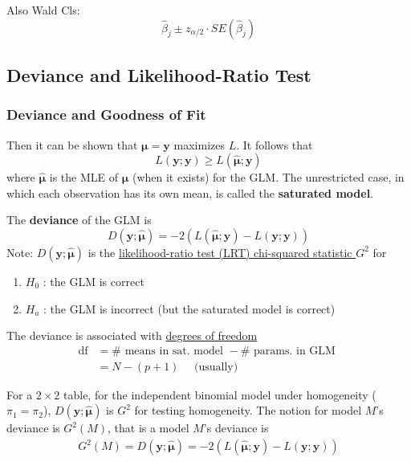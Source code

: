 \documentclass[11pt]{elegantbook}
\begin{document}
Also Wald Cls:
$$
\hat{\beta}_j \pm z_{\alpha / 2} \cdot S E\left(\hat{\beta}_j\right)
$$





\subsection{Deviance  and Likelihood-Ratio Test}
\subsubsection{ Deviance and Goodness of Fit}
Then it can be shown that $\boldsymbol{\mu}=\boldsymbol{y}$ maximizes $L$.
It follows that
$$
L(\boldsymbol{y} ; \boldsymbol{y}) \geq L(\hat{\boldsymbol{\mu}} ; \boldsymbol{y})
$$
where $\hat{\boldsymbol{\mu}}$ is the MLE of $\boldsymbol{\mu}$ (when it exists) for the GLM.
The unrestricted case, in which each observation has its own mean, is called the \textbf{saturated model}.

\begin{definition}[Deviance]
    \normalfont
    The \textbf{deviance} of the GLM is
    $$
    D(\boldsymbol{y} ; \hat{\boldsymbol{\mu}})=-2(L(\hat{\boldsymbol{\mu}} ; \boldsymbol{y})-L(\boldsymbol{y} ; \boldsymbol{y}))
    $$
    Note: $D(\boldsymbol{y} ; \hat{\boldsymbol{\mu}})$ is the \underline{likelihood-ratio test (LRT) chi-squared statistic $G^2$} for
    \begin{enumerate}[-]
        \item $H_0$ : the GLM is correct
        \item $H_a$ : the GLM is incorrect
        (but the saturated model is correct)
    \end{enumerate}
\end{definition}
The deviance is associated with \underline{degrees of freedom}
$$
\begin{aligned}
\mathrm{df} & =\# \text { means in sat. model }-\# \text { params. in GLM } \\
& =N-(p+1) \quad \text { (usually) }
\end{aligned}
$$

For a $2 \times 2$ table, for the independent binomial model under homogeneity ($\pi_1 = \pi_2$), $D(\boldsymbol{y} ; \hat{\boldsymbol{\mu}})$ is $G^2$ for testing homogeneity. The notion for model $M$'s deviance is $G^2(M)$, that is a model $M$'s deviance is
\begin{equation}
    \begin{aligned}
        G^2(M)=D(\boldsymbol{y} ; \hat{\boldsymbol{\mu}})=-2(L(\hat{\boldsymbol{\mu}} ; \boldsymbol{y})-L(\boldsymbol{y} ; \boldsymbol{y}))
    \end{aligned}
    \nonumber
\end{equation}
\end{document}
